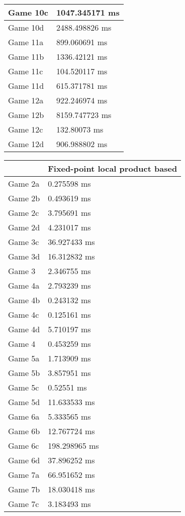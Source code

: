 \begin{tabular}{|l|l|}
	Game 10c & 1047.345171 ms \\ \hline
	Game 10d & 2488.498826 ms \\ \hline
	Game 11a & 899.060691 ms \\ \hline
	Game 11b & 1336.42121 ms \\ \hline
	Game 11c & 104.520117 ms \\ \hline
	Game 11d & 615.371781 ms \\ \hline
	Game 12a & 922.246974 ms \\ \hline
	Game 12b & 8159.747723 ms \\ \hline
	Game 12c & 132.80073 ms \\ \hline
	Game 12d & 906.988802 ms \\ \hline
\end{tabular}
\begin{tabular}{|l|l|}
	\hline
	& Fixed-point local product based \\ \hline
	Game 2a & 0.275598 ms \\ \hline
	Game 2b & 0.493619 ms \\ \hline
	Game 2c & 3.795691 ms \\ \hline
	Game 2d & 4.231017 ms \\ \hline
	Game 3c & 36.927433 ms \\ \hline
	Game 3d & 16.312832 ms \\ \hline
	Game 3 & 2.346755 ms \\ \hline
	Game 4a & 2.793239 ms \\ \hline
	Game 4b & 0.243132 ms \\ \hline
	Game 4c & 0.125161 ms \\ \hline
	Game 4d & 5.710197 ms \\ \hline
	Game 4 & 0.453259 ms \\ \hline
	Game 5a & 1.713909 ms \\ \hline
	Game 5b & 3.857951 ms \\ \hline
	Game 5c & 0.52551 ms \\ \hline
	Game 5d & 11.633533 ms \\ \hline
	Game 6a & 5.333565 ms \\ \hline
	Game 6b & 12.767724 ms \\ \hline
	Game 6c & 198.298965 ms \\ \hline
	Game 6d & 37.896252 ms \\ \hline
	Game 7a & 66.951652 ms \\ \hline
	Game 7b & 18.030418 ms \\ \hline
	Game 7c & 3.183493 ms \\ \hline

\end{tabular}
